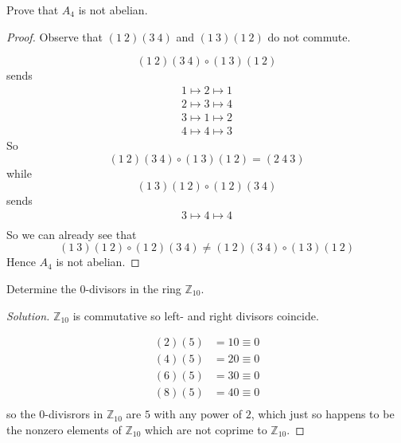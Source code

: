 \begin{prob}
    Prove that $A_4$ is not abelian.
\end{prob}
\begin{proof}
    Observe that $(1 \ 2)(3 \ 4)$ and $(1 \ 3)(1 \ 2)$ do not 
    commute.

    \[
        (1 \ 2)(3 \ 4) \circ (1 \ 3)(1 \ 2)  
    \]
    sends 
    \begin{align*}
        1 \mapsto 2 \mapsto 1 \\ 
        2 \mapsto 3 \mapsto 4 \\ 
        3 \mapsto 1 \mapsto 2 \\ 
        4 \mapsto 4 \mapsto 3
    \end{align*}
    So 
    \[
        (1 \ 2)(3 \ 4) \circ (1 \ 3)(1 \ 2)  
        = (2 \ 4 \ 3)
    \]
    while 
    \[
        (1 \ 3)(1 \ 2) \circ (1 \ 2)(3 \ 4)
    \]
    sends 
    \begin{align*}
        3 \mapsto 4 \mapsto 4 \\
    \end{align*}
    So we can already see that 
    \[
        (1 \ 3)(1 \ 2) \circ (1 \ 2)(3 \ 4) 
        \neq 
        (1 \ 2)(3 \ 4) \circ (1 \ 3)(1 \ 2)
    \]
    Hence $A_4$ is not abelian.
\end{proof}

\newpage 
\begin{prob}
    Determine the $0$-divisors in the ring $\mathbb Z_{10}$.
\end{prob}
\begin{proof}[Solution]
    $\mathbb Z_{10}$ is commutative so left- and right 
    divisors coincide. 

    \begin{align*}
        (2)(5) &= 10 \equiv 0 \\ 
        (4)(5) &= 20 \equiv 0 \\ 
        (6)(5) &= 30 \equiv 0 \\ 
        (8)(5) &= 40 \equiv 0 \\ 
    \end{align*}
    so the $0$-divisrors in $\mathbb Z_{10}$ are 
    $5$ with any power of $2$, which just so happens to be 
    the nonzero elements of $\mathbb Z_{10}$ which are not coprime to 
    $\mathbb Z_{10}$.
\end{proof}

